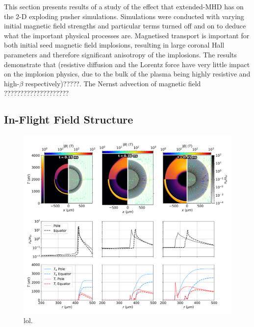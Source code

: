 This section presents results of a study of the effect that extended-\ac{MHD} has on the 2-D exploding pusher simulations.
Simulations were conducted with varying initial magnetic field strengths and particular terms turned off and on to deduce what the important physical processes are.
Magnetised transport is important for both initial seed magnetic field implosions, resulting in large coronal Hall parameters and therefore significant anisotropy of the implosions.
The results demonstrate that (resistive diffusion and the Lorentz force have very little impact on the implosion physics, due to the bulk of the plasma being highly resistive and high-$\beta$ respectively)?????.
The Nernst advection of magnetic field ????????????????????


\subsection{In-Flight Field Structure}%
\label{sec:Res2_field_structure}


\begin{figure}[t!]
    \includegraphics[width=\linewidth]{Results2/Images/mag_early_B_develop.png}
    \centering
    \caption{lol.}%
    \label{fig:Res2_mag_early_B_develop}
\end{figure}



